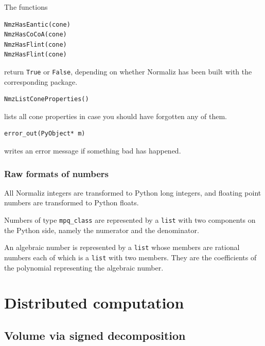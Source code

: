 \begin{small}
The functions
\begin{Verbatim}
NmzHasEantic(cone)
NmzHasCoCoA(cone)
NmzHasFlint(cone)
NmzHasFlint(cone)
\end{Verbatim}
return \verb|True| or \verb|False|, depending on whether Normaliz has been built with the corresponding package.

\begin{Verbatim}
NmzListConeProperties() 
\end{Verbatim}
lists all cone properties in case you should have forgotten any of them.

\begin{Verbatim}
error_out(PyObject* m)
\end{Verbatim}
writes an error message if something bad has happened.

\subsubsection{Raw formats of numbers}

All Normaliz integers are transformed to Python long integers, and floating point numbers are transformed to Python floats.

Numbers of type \verb|mpq_class| are represented by a \verb|list| with two components on the Python side, namely the numerator and the denominator.

An algebraic number is represented by a \verb|list| whose members are rational numbers each of which is a \verb|list| with two members. They are the coefficients of the polynomial representing the algebraic number.

\end{small}

\newpage

\section{Distributed computation}

\subsection{Volume via signed decomposition}\label{distr_comp}

